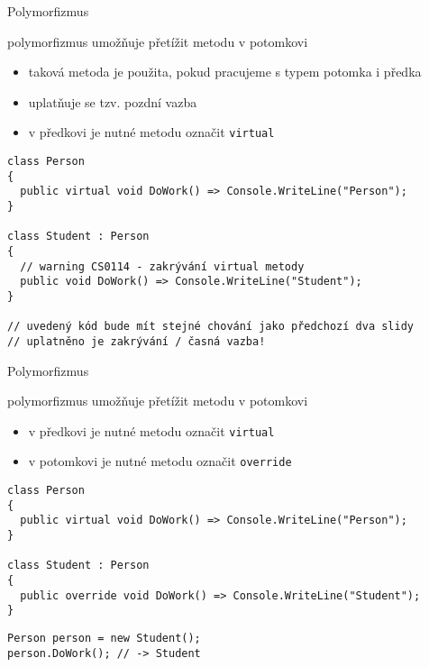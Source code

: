 \begin{frame}[fragile]
\begin{bitemize}{Polymorfizmus}
\item polymorfizmus umožňuje přetížit metodu v potomkovi
\begin{itemize}
\item taková metoda je použita, pokud pracujeme s typem potomka i předka
\item uplatňuje se tzv. pozdní vazba
\item v předkovi je nutné metodu označit \lstinline|virtual|
\end{itemize}

\end{bitemize}

\begin{noblock}
\begin{lstlisting}[basicstyle=\small]
class Person
{
  public virtual void DoWork() => Console.WriteLine("Person");
}

class Student : Person
{
  // warning CS0114 - zakrývání virtual metody
  public void DoWork() => Console.WriteLine("Student");
}

// uvedený kód bude mít stejné chování jako předchozí dva slidy
// uplatněno je zakrývání / časná vazba!
\end{lstlisting}
\end{noblock}
\end{frame}



\begin{frame}[fragile]
\begin{bitemize}{Polymorfizmus}
\item polymorfizmus umožňuje přetížit metodu v potomkovi
\begin{itemize}
\item v předkovi je nutné metodu označit \lstinline|virtual|
\item v potomkovi je nutné metodu označit \lstinline|override|
\end{itemize}

\end{bitemize}

\begin{yesblock}
\begin{lstlisting}[basicstyle=\small]
class Person
{
  public virtual void DoWork() => Console.WriteLine("Person");
}

class Student : Person
{
  public override void DoWork() => Console.WriteLine("Student");
}
\end{lstlisting}
\end{yesblock}

\begin{yesblock}
\begin{lstlisting}[basicstyle=\small]
Person person = new Student();
person.DoWork(); // -> Student
\end{lstlisting}
\end{yesblock}
\end{frame}


